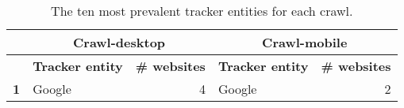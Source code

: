 \begin{table}[ht] 
\caption{The ten most prevalent tracker entities for each crawl.} 
\centering 
\begin{tabular}{|l|ll|ll|} 
\hline\textbf{} & \multicolumn{2}{c|}{\textbf{Crawl-desktop}} & \multicolumn{2}{c|}{\textbf{Crawl-mobile}} \\ \hline 
& \multicolumn{1}{r|}{\textbf{Tracker entity}} & \textbf{\# websites} & \multicolumn{1}{l|}{\textbf{Tracker entity}} & \textbf{\# websites} \\ \hline 
\textbf{1} & \multicolumn{1}{l|}{Google} & \multicolumn{1}{r|}{4} & \multicolumn{1}{l|}{Google} & \multicolumn{1}{r|}{2} \\ \hline 
\end{tabular} 
\label{tab:TrackerEntityTop10} 
\end{table}